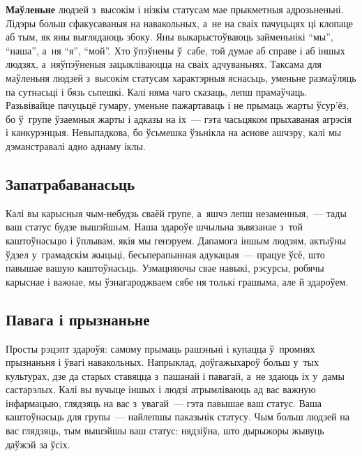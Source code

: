 \textbf{Маўленьне} людзей з~высокім і нізкім статусам мае прыкметныя адрозьненьні. Лідэры больш сфакусаваныя на навакольных, а~не на сваіх пачуцьцях ці клопаце аб тым, як яны выглядаюць збоку. Яны выкарыстоўваюць займеньнікі ``мы'', ``наша'', а~ня ``я'', ``мой''. Хто ўпэўнены ў~сабе, той думае аб справе і аб іншых людзях, а~няўпэўненыя зацыкліваюцца на сваіх адчуваньнях. Таксама для маўленьня людзей з~высокім статусам характэрныя яснасьць, уменьне размаўляць па сутнасьці і бязь сьпешкі. Калі няма чаго сказаць, лепш прамаўчаць. Разьвівайце пачуцьцё гумару, уменьне пажартаваць і не прымаць жарты ўсур'ёз, бо ў~групе ўзаемныя жарты і адказы на іх~--- гэта часьцяком прыхаваная агрэсія і канкурэнцыя. Невыпадкова, бо ўсьмешка ўзьнікла на аснове ашчэру, калі мы дэманстравалі адно аднаму іклы.


\subsection*{Запатрабаванасьць} Калі вы карысныя чым-небудзь сваёй групе, а~яшчэ лепш незаменныя,~--- тады ваш статус будзе вышэйшым. Наша здароўе шчыльна зьвязанае з~той каштоўнасьцю і ўплывам, якія мы генэруем. Дапамога іншым людзям, актыўны ўдзел у~грамадскім жыцьці, бесьперапынная адукацыя~--- працуе ўсё, што павышае вашую каштоўнасьць. Узмацняючы свае навыкі, рэсурсы, робячы карыснае і важнае, мы ўзнагароджваем сябе ня толькі грашыма, але й здароўем.

\subsection*{Павага і прызнаньне}

Просты рэцэпт здароўя: самому прымаць рашэньні і купацца ў~промнях прызнаньня і ўвагі навакольных. Напрыклад, доўгажыхароў больш у~тых культурах, дзе да старых ставяцца з~пашанай і павагай, а~не здаюць іх у~дамы састарэлых. Калі вы вучыце іншых і людзі атрымліваюць ад вас важную інфармацыю, глядзяць на вас з~увагай~--- гэта павышае ваш статус. Ваша каштоўнасьць для групы~--- найлепшы паказьнік статусу. Чым больш людзей на вас глядзяць, тым вышэйшы ваш статус: нядзіўна, што дырыжоры жывуць даўжэй за ўсіх.

